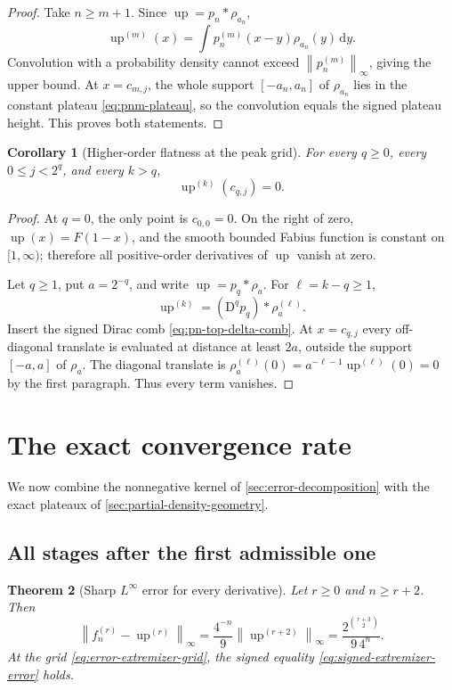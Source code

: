 \documentclass[11pt,oneside]{article}
\newtheorem{theorem}{Theorem}[section]
\newtheorem{corollary}[theorem]{Corollary}
\theoremstyle{definition}
\theoremstyle{remark}
\newcommand{\Up}{\operatorname{up}}
\newcommand{\conv}{*}
\newcommand{\dd}{\,\mathrm d}
\newcommand{\norm}[1]{\left\lVert#1\right\rVert}
\newcommand{\D}{\mathrm D}
\begin{document}
\begin{proof}
Take $n\ge m+1$.  Since $\Up=p_n\conv\rho_{a_n}$,
\[
 \Up^{(m)}(x)=\int p_n^{(m)}(x-y)\rho_{a_n}(y)\dd y.
\]
Convolution with a probability density cannot exceed
$\norm{p_n^{(m)}}_\infty$, giving the upper bound.  At $x=c_{m,j}$, the whole support
$[-a_n,a_n]$ of $\rho_{a_n}$ lies in the constant plateau
\eqref{eq:pnm-plateau}, so the convolution equals the signed plateau height.  This proves
both statements.
\end{proof}

\begin{corollary}[Higher-order flatness at the peak grid]
\label{cor:higher-flatness-grid}
For every $q\ge0$, every $0\le j<2^q$, and every $k>q$,
\begin{equation}
 \Up^{(k)}(c_{q,j})=0.
 \label{eq:higher-flatness-grid}
\end{equation}
\end{corollary}

\begin{proof}
At $q=0$, the only point is $c_{0,0}=0$.  On the right of zero,
$\Up(x)=F(1-x)$, and the smooth bounded Fabius function is constant on $[1,\infty)$;
therefore all positive-order derivatives of $\Up$ vanish at zero.

Let $q\ge1$, put $a=2^{-q}$, and write $\Up=p_q\conv\rho_a$.  For
$\ell=k-q\ge1$,
\[
 \Up^{(k)}=(\D^q p_q)\conv\rho_a^{(\ell)}.
\]
Insert the signed Dirac comb \eqref{eq:pn-top-delta-comb}.  At $x=c_{q,j}$ every
off-diagonal translate is evaluated at distance at least $2a$, outside the support
$[-a,a]$ of $\rho_a$.  The diagonal translate is
$\rho_a^{(\ell)}(0)=a^{-\ell-1}\Up^{(\ell)}(0)=0$ by the first paragraph.
Thus every term vanishes.
\end{proof}

\section{The exact convergence rate}
\label{sec:exact-rate}

We now combine the nonnegative kernel of \cref{sec:error-decomposition} with the exact
plateaux of \cref{sec:partial-density-geometry}.

\subsection{All stages after the first admissible one}

\begin{theorem}[Sharp $L^\infty$ error for every derivative]
\label{thm:sharp-derivative-error}
Let $r\ge0$ and $n\ge r+2$.  Then
\begin{equation}
 \norm{f_n^{(r)}-\Up^{(r)}}_\infty
 =\frac{4^{-n}}{9}\norm{\Up^{(r+2)}}_\infty
 =\frac{2^{\binom{r+3}{2}}}{9\,4^n}.
 \label{eq:sharp-derivative-error}
\end{equation}
At the grid \eqref{eq:error-extremizer-grid}, the signed equality
\eqref{eq:signed-extremizer-error} holds.
\end{theorem}
\end{document}
